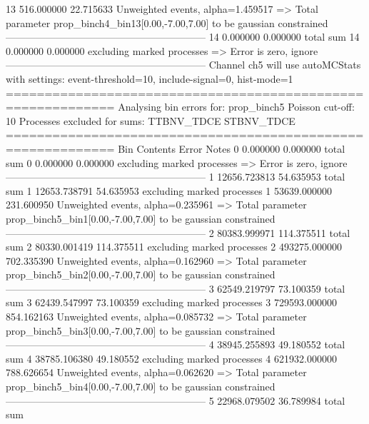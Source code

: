 13         516.000000      22.715633       Unweighted events, alpha=1.459517
  => Total parameter prop_binch4_bin13[0.00,-7.00,7.00] to be gaussian constrained
------------------------------------------------------------
14         0.000000        0.000000        total sum                     
14         0.000000        0.000000        excluding marked processes    
  => Error is zero, ignore      
------------------------------------------------------------
Channel ch5 will use autoMCStats with settings: event-threshold=10, include-signal=0, hist-mode=1
============================================================
Analysing bin errors for: prop_binch5
Poisson cut-off: 10
Processes excluded for sums: TTBNV_TDCE STBNV_TDCE
============================================================
Bin        Contents        Error           Notes                         
0          0.000000        0.000000        total sum                     
0          0.000000        0.000000        excluding marked processes    
  => Error is zero, ignore      
------------------------------------------------------------
1          12656.723813    54.635953       total sum                     
1          12653.738791    54.635953       excluding marked processes    
1          53639.000000    231.600950      Unweighted events, alpha=0.235961
  => Total parameter prop_binch5_bin1[0.00,-7.00,7.00] to be gaussian constrained
------------------------------------------------------------
2          80383.999971    114.375511      total sum                     
2          80330.001419    114.375511      excluding marked processes    
2          493275.000000   702.335390      Unweighted events, alpha=0.162960
  => Total parameter prop_binch5_bin2[0.00,-7.00,7.00] to be gaussian constrained
------------------------------------------------------------
3          62549.219797    73.100359       total sum                     
3          62439.547997    73.100359       excluding marked processes    
3          729593.000000   854.162163      Unweighted events, alpha=0.085732
  => Total parameter prop_binch5_bin3[0.00,-7.00,7.00] to be gaussian constrained
------------------------------------------------------------
4          38945.255893    49.180552       total sum                     
4          38785.106380    49.180552       excluding marked processes    
4          621932.000000   788.626654      Unweighted events, alpha=0.062620
  => Total parameter prop_binch5_bin4[0.00,-7.00,7.00] to be gaussian constrained
------------------------------------------------------------
5          22968.079502    36.789984       total sum                     
